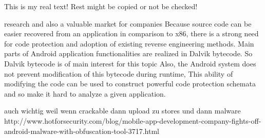This is my real text! Rest might be copied or not be checked!



%
research and also a valuable market for companies\newline
Because source code can be easier recovered from an application in comparison
to x86, there is a strong need for code protection and adoption of existing reverse engineering methods. Main parts of Android application functionalities are realized in Dalvik bytecode. So Dalvik bytecode is of main interest for this topic\newline
Also, the Android system does not prevent modification of this bytecode during runtime, This ability of modifying the code can be used to construct
powerful code protection schemata and so make it hard to analyze a given application.\newline
\cite{schulzCodeProtection}
%


auch wichtig weil wenn crackable dann upload zu stores und dann malware \newline
http://www.hotforsecurity.com/blog/mobile-app-development-company-fights-off-android-malware-with-obfuscation-tool-3717.html\newline
